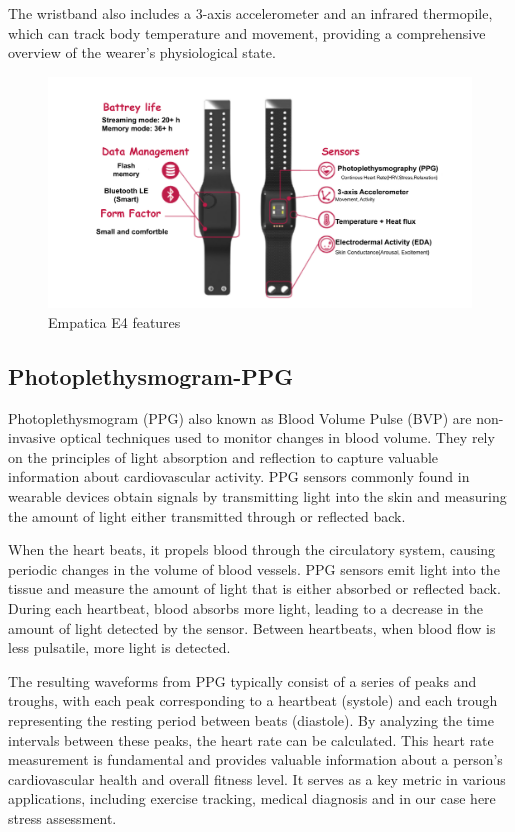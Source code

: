The wristband also includes a 3-axis accelerometer and an infrared thermopile, which can track body temperature and movement, providing a comprehensive overview of the wearer's physiological state.



\begin{figure}[!htbp]
	\centering
	\includegraphics[width=0.8\columnwidth]{images/e4.drawio.pdf}
	\caption{Empatica E4 features \parencite{emp}}
	\label{fig:empatica}
\end{figure}


\subsection*{Photoplethysmogram-PPG }
\label{subsec:PPGtheory}

Photoplethysmogram (PPG) also known as  Blood Volume Pulse (BVP) are non-invasive optical techniques used to monitor changes in blood volume. They rely on the principles of light absorption and reflection to capture valuable information about cardiovascular activity. \gls{PPG} sensors commonly found in wearable devices obtain  signals by transmitting light into the skin and measuring the amount of light either transmitted through or reflected back.\parencite{ppg} 

When the heart beats, it propels blood through the circulatory system, causing periodic changes in the volume of blood vessels. PPG sensors emit light into the tissue and measure the amount of light that is either absorbed or reflected back. During each heartbeat, blood absorbs more light, leading to a decrease in the amount of light detected by the sensor. Between heartbeats, when blood flow is less pulsatile, more light is detected.\parencite{ppg2}

The resulting waveforms from PPG typically consist of a series of peaks and troughs, with each peak corresponding to a heartbeat (systole) and each trough representing the resting period between beats (diastole). By analyzing the time intervals between these peaks, the heart rate can be calculated. This heart rate measurement is fundamental and provides valuable information about a person's cardiovascular health and overall fitness level. It serves as a key metric in various applications, including exercise tracking, medical diagnosis and in our case here stress assessment.

